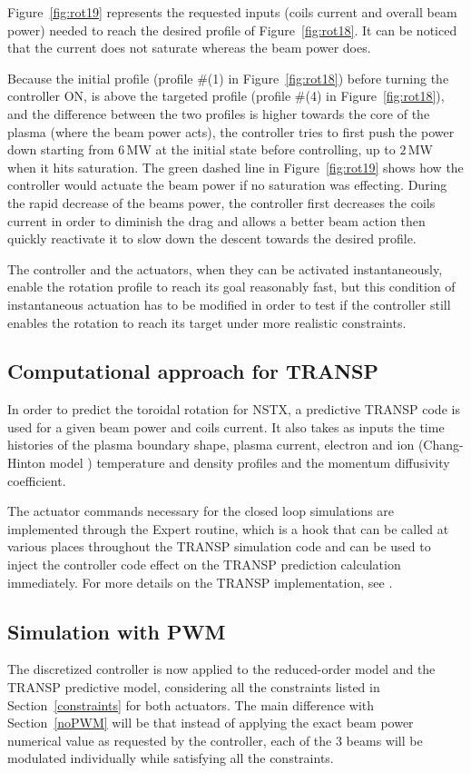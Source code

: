 \documentclass[12pt]{iopart}
\begin{document}
Figure~\ref{fig:rot19} represents the requested inputs (coils current and overall beam power) needed to reach the desired profile of Figure~\ref{fig:rot18}. It can be noticed that the current does not saturate whereas the beam power does.

Because the initial profile (profile \#(1) in Figure~\ref{fig:rot18}) before turning the controller ON, is above the targeted profile  (profile \#(4) in Figure~\ref{fig:rot18}), and the difference between the two profiles is higher towards the core of the plasma (where the beam power acts), the controller tries to first push the power down starting from $6$\,MW at the initial state before controlling, up to $2$\,MW when it hits saturation. The green dashed line in Figure~\ref{fig:rot19} shows how the controller would actuate the beam power if no saturation was effecting. 
During the rapid decrease of the beams power, the controller first decreases the coils current in order to diminish the drag and allows a better beam action then quickly reactivate it to slow down the descent towards the desired profile.  

The controller and the actuators, when they can be activated instantaneously, enable the rotation profile to reach its goal reasonably fast, but this condition of instantaneous actuation has to be modified in order to test if the controller still enables the rotation to reach its target under more realistic constraints.

\subsection{Computational approach for TRANSP}
In order to predict the toroidal rotation for NSTX, a predictive TRANSP code is used for a given beam power and coils current. It also takes as inputs the time histories of the plasma boundary shape, plasma current, electron and ion (Chang-Hinton model \cite{Changhinton}) temperature and density profiles and the momentum diffusivity coefficient.

The actuator commands necessary for the closed loop simulations are implemented through the Expert routine, which is a hook that can be called at various places throughout the TRANSP simulation code and can be used to inject the controller code effect on the TRANSP prediction calculation immediately. For more details on the TRANSP implementation, see \cite{Boyer15}.

\subsection{Simulation with PWM}
The discretized controller is now applied to the reduced-order model and the TRANSP predictive model, considering all the constraints listed in Section~\ref{constraints} for both actuators. The main difference with Section~\ref{noPWM} will be that instead of applying the exact beam power numerical value as requested by the controller, each of the 3 beams will be modulated individually while satisfying all the constraints.
\end{document}

